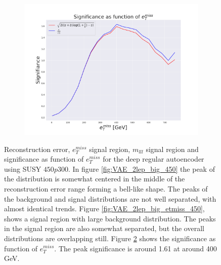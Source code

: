\begin{figure}[H]
    \hfill 
    \begin{subfigure}{.50\textwidth}
        \includegraphics[width=\textwidth]{Figures/VAE_testing/big/2lep/significance_etmiss_450p0p0300_-0.8121874101107931.pdf}
        \caption{}
        \label{fig:VAE_2lep_big_signi_450}
    \end{subfigure}
    \hfill      
    \caption[2lep deep network | $450p300$ | VAE]{Reconstruction error, $e_T^{miss}$ signal region, $m_{lll}$ signal region and significance as function of 
    $e_T^{miss}$ for the deep regular autoencoder using SUSY $450p300$. 
    In figure \ref{fig:VAE_2lep_big_450} the peak of the distribution is somewhat centered in the middle 
    of the reconstruction error range forming a bell-like shape. The peaks of the background and signal 
    distributions are not well separated, with almost identical trends. Figure \ref{fig:VAE_2lep_big_etmiss_450}, 
    shows a signal region with large background distribution. The peaks in the signal region are also somewhat 
    separated, but the overall distributions are overlapping still. 
    Figure \ref{fig:VAE_2lep_big_rec_sig_signi_450} shows the significance as function of $e_T^{miss}$. 
    The peak significance is around 1.61 at around 400 GeV.}
    \label{fig:VAE_2lep_big_rec_sig_signi_450}
\end{figure}

